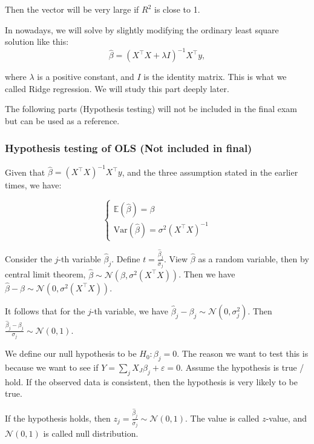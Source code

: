 \documentclass{article}
\theoremstyle{MyNonumberplain}
\theoremstyle{break}
\newcommand{\ve}{\varepsilon}
\newcommand{\ev}{\mathbb{E}}
\newcommand{\var}{\text{Var}}
\newcommand{\T}{^\intercal}
\newcommand{\inv}{^{-1}}
\theoremstyle{break}
\begin{document}
Then the vector will be very large if $R^2$ is close to 1.

In nowadays, we will solve by slightly modifying the ordinary least square solution like this:
$$
\hat\beta=(X\T X+\lambda I)\inv X\T y,
$$

where $\lambda$ is a positive constant, and $I$ is the identity matrix. This is what we called Ridge regression. We will study this part deeply later.

The following parts (Hypothesis testing) will not be included in the final exam but can be used as a reference.

\subsubsection{Hypothesis testing of OLS (Not included in final)}

Given that $\hat\beta=(X\T X)\inv X\T y$, and the three assumption stated in the earlier times, we have:

$$
\begin{cases}
\ev(\hat\beta)=\beta \\
\var(\hat\beta)=\sigma^2(X\T X)\inv
\end{cases}
$$

Consider the $j$-th variable $\hat\beta_j$. Define $t=\frac{\hat\beta_j}{\hat\sigma_j}$.
View $\hat\beta$ as a random variable, then by central limit theorem, $\hat\beta\sim \mathcal{N}(\beta,\sigma^2(X\T X))$. Then we have $\hat\beta-\beta\sim\mathcal{N}(0,\sigma^2(X\T X))$.

It follows that for the $j$-th variable, we have $\hat\beta_j-\beta_j\sim\mathcal{N}(0,\sigma^2_j)$. Then $\frac{\hat\beta_j-\beta_j}{\sigma_j}\sim\mathcal{N}(0,1)$.

We define our null hypothesis to be $H_0:\beta_j=0$. 
The reason we want to test this is because we want to see if $Y=\sum_jX_J\beta_j+\ve=0$.
Assume the hypothesis is true / hold. If the observed data is consistent, then the hypothesis is very likely to be true. 

If the hypothesis holds, then $z_j=\frac{\hat\beta_j}{\hat\sigma_j}\sim \mathcal{N}(0,1)$. The value is called $z$-value, and $\mathcal{N}(0,1)$ is called null distribution.
\end{document}

